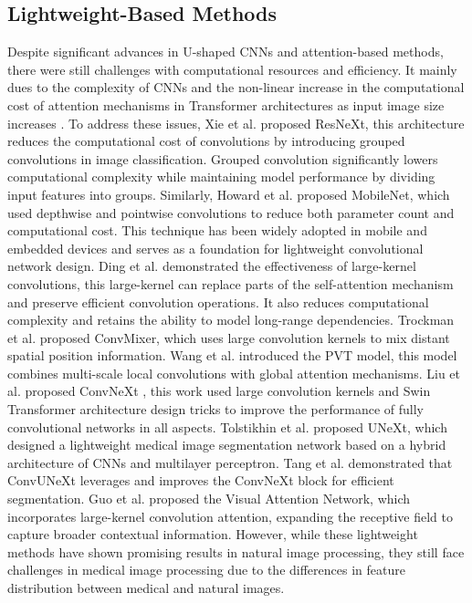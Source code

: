 \documentclass[sn-mathphys-num]{sn-jnl}
\theoremstyle{thmstyleone}%
\theoremstyle{thmstyletwo}%
\theoremstyle{thmstylethree}%
\begin{document}
\subsection{Lightweight-Based Methods}
Despite significant advances in U-shaped CNNs and attention-based methods, there were still challenges with computational resources and efficiency.
It mainly dues to the complexity of CNNs and the non-linear increase in the computational cost of attention mechanisms in Transformer architectures as input image size increases \cite{zheng2024lightweight}.
To address these issues, Xie et al. \cite{xie2017aggregated} proposed ResNeXt, this architecture reduces the computational cost of convolutions by introducing grouped convolutions in image classification.
Grouped convolution significantly lowers computational complexity while maintaining model performance by dividing input features into groups.
Similarly, Howard et al. \cite{howard2017mobilenets} proposed MobileNet, which used depthwise and pointwise convolutions to reduce both parameter count and computational cost.
This technique has been widely adopted in mobile and embedded devices and serves as a foundation for lightweight convolutional network design. 
Ding et al. \cite{ding2021repvgg} demonstrated the effectiveness of large-kernel convolutions, this large-kernel can replace parts of the self-attention mechanism and preserve efficient convolution operations.
It also reduces computational complexity and retains the ability to model long-range dependencies.
Trockman et al. \cite{trockman2022patches} proposed ConvMixer, which uses large convolution kernels to mix distant spatial position information.
Wang et al. \cite{wang2021pyramid} introduced the PVT model, this model combines multi-scale local convolutions with global attention mechanisms.
Liu et al. proposed ConvNeXt \cite{liu2022convnet}, this work used large convolution kernels and Swin Transformer \cite{liu2021swin} architecture design tricks to improve the performance of fully convolutional networks in all aspects.
Tolstikhin et al. \cite{tolstikhin2021mlp} proposed UNeXt, which designed a lightweight medical image segmentation network based on a hybrid architecture of CNNs and multilayer perceptron.
Tang et al. \cite{tang2023cmu} demonstrated that ConvUNeXt leverages and improves the ConvNeXt block for efficient segmentation.
Guo et al. \cite{guo2023visual} proposed the Visual Attention Network, which incorporates large-kernel convolution attention, expanding the receptive field to capture broader contextual information.
However, while these lightweight methods have shown promising results in natural image processing, they still face challenges in medical image processing due to the differences in feature distribution between medical and natural images.	
\end{document}
